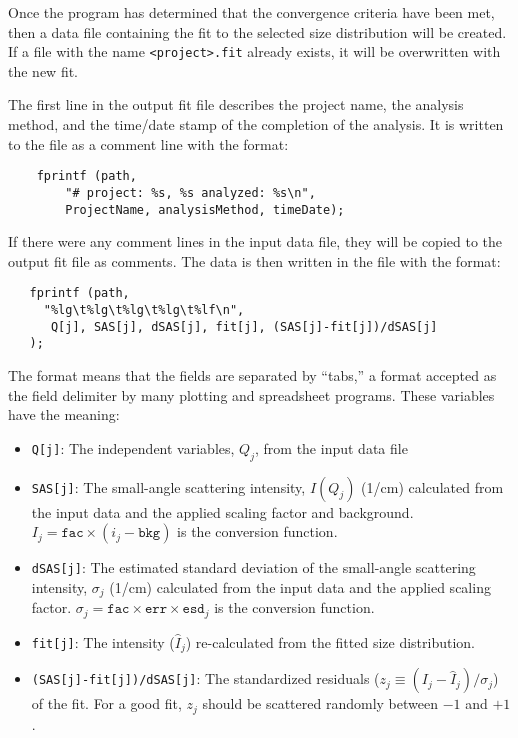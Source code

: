 \documentclass[letterpaper]{article}
\begin{document}
Once the program has determined that the convergence 
criteria have been met, then a data file containing
the fit to the selected size distribution will be 
created.  If a file with the name 
\texttt{<project>.fit} already exists, it will be 
overwritten with the new fit.

The first line in the output fit file describes the 
project name, the analysis method, and the time/date 
stamp of the completion of the analysis.  It is 
written to the file as a comment line with the format:
\begin{verbatim}
    fprintf (path, 
        "# project: %s, %s analyzed: %s\n",
        ProjectName, analysisMethod, timeDate);
\end{verbatim}

If there were any comment lines in the input data 
file, they will be copied to the output fit file as 
comments.  The data is then written in the file with the format:
\begin{verbatim}
   fprintf (path, 
     "%lg\t%lg\t%lg\t%lg\t%lf\n", 
      Q[j], SAS[j], dSAS[j], fit[j], (SAS[j]-fit[j])/dSAS[j]
   );
\end{verbatim}
The format means that the fields are separated by 
``tabs,'' a format accepted as the field 
delimiter by many plotting and spreadsheet programs.
These variables have the meaning:
\begin{itemize}
  \item \verb|Q[j]|: The independent variables, $Q_j$, from 
     the input data file
  \item \verb|SAS[j]|: The small-angle scattering intensity, 
     $I(Q_j)$ (1/cm) calculated from 
     the input data and the applied scaling factor 
     and background.  $I_j = \mathtt{fac} \times 
     (i_j - \mathtt{bkg})$ is the conversion function.
  \item \verb|dSAS[j]|: The estimated standard deviation of 
     the small-angle scattering intensity, 
     $\sigma_j$ (1/cm) calculated from 
     the input data and the applied scaling factor.
     $\sigma_j = \mathtt{fac} \times \mathtt{err} 
     \times \mathtt{esd}_j$ is the conversion function.
  \item \verb|fit[j]|: The intensity ($\hat I_j$) 
     re-calculated from the 
     fitted size distribution.
  \item \verb|(SAS[j]-fit[j])/dSAS[j]|: The standardized 
     residuals ($z_j \equiv (I_j - \hat I_j)/\sigma_j$) 
     of the fit.  For a good fit, $z_j$ should 
     be scattered randomly between $-1$ and $+1$.
\end{itemize}
\end{document}
